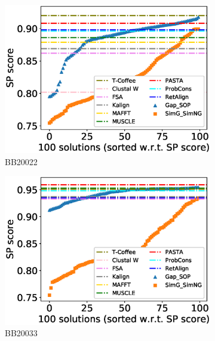 \begin{figure}[!htbp]
\begin{adjustwidth}{-1.5cm}{-1cm}
\begin{subfigure}{0.22\textwidth}
			\includegraphics[width=\columnwidth]{Figure/summary/precomputedInit/Balibase/BB20022_pairs_density_single_run_2}
			\caption{BB20022}
		\end{subfigure}
		\begin{subfigure}{0.22\textwidth}
			\includegraphics[width=\columnwidth]{Figure/summary/precomputedInit/Balibase/BB20033_pairs_density_single_run_2}
			\caption{BB20033}
		\end{subfigure}
		\begin{subfigure}{0.22\textwidth}

\end{subfigure}
\end{adjustwidth}
\end{figure}
